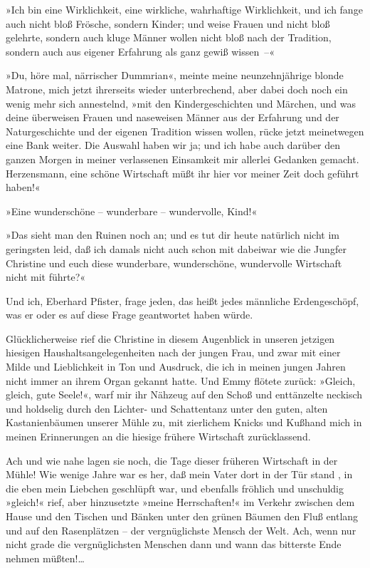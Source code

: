 »Ich bin eine Wirklichkeit, eine wirkliche, wahrhaftige
Wirklichkeit, und ich fange auch nicht bloß Frösche, sondern
Kinder; und weise Frauen und nicht bloß gelehrte, sondern auch
kluge Männer wollen nicht bloß nach der Tradition, sondern auch aus
eigener Erfahrung als ganz gewiß wissen~–«

»Du, höre mal, närrischer Dummrian«, meinte meine neunzehnjährige
blonde Matrone, mich jetzt ihrerseits wieder unterbrechend, aber
dabei doch noch ein wenig mehr sich annestelnd, »mit den
Kindergeschichten und Märchen, und was deine überweisen Frauen und
naseweisen Männer aus der Erfahrung und der Naturgeschichte und der
eigenen Tradition wissen wollen, rücke jetzt meinetwegen eine Bank
weiter. Die Auswahl haben wir ja; und ich habe auch darüber den
ganzen Morgen in meiner verlassenen Einsamkeit mir allerlei
Gedanken gemacht. Herzensmann, eine schöne Wirtschaft müßt ihr hier
vor meiner Zeit doch geführt haben!«

»Eine wunderschöne – wunderbare – wundervolle, Kind!«

»Das sieht man den Ruinen noch an; und es tut dir heute natürlich
nicht im geringsten leid, daß ich damals nicht auch schon mit
dabeiwar wie die Jungfer Christine und euch diese wunderbare,
wunderschöne, wundervolle Wirtschaft nicht mit führte?«

Und ich, Eberhard Pfister, frage jeden, das heißt jedes männliche
Erdengeschöpf, was er oder es auf diese Frage geantwortet haben
würde.

Glücklicherweise rief die Christine in diesem Augenblick in unseren
jetzigen hiesigen Haushaltsangelegenheiten nach der jungen Frau,
und zwar mit einer Milde und Lieblichkeit in Ton und Ausdruck, die
ich in meinen jungen Jahren nicht immer an ihrem Organ gekannt
hatte. Und Emmy flötete zurück: »Gleich, gleich, gute Seele!«, warf
mir ihr Nähzeug auf den Schoß und enttänzelte neckisch und
holdselig durch den Lichter- und Schattentanz unter den guten,
alten Kastanienbäumen unserer Mühle zu, mit zierlichem Knicks und
Kußhand mich in meinen Erinnerungen an die hiesige frühere
Wirtschaft zurücklassend.

Ach und wie nahe lagen sie noch, die Tage dieser früheren
Wirtschaft in der Mühle! Wie wenige Jahre war es her, daß mein
Vater dort in der Tür stand , in die eben mein Liebchen geschlüpft
war, und ebenfalls fröhlich und unschuldig »gleich!« rief, aber
hinzusetzte »meine Herrschaften!« im Verkehr zwischen dem Hause und
den Tischen und Bänken unter den grünen Bäumen den Fluß entlang und
auf den Rasenplätzen – der vergnüglichste Mensch der Welt. Ach,
wenn nur nicht grade die vergnüglichsten Menschen dann und wann das
bitterste Ende nehmen müßten!\ldots{}

